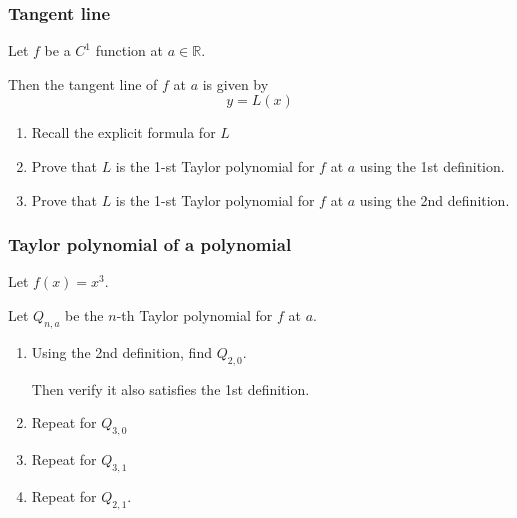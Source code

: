 \begin{frame}[t]
	\frametitle{Tangent line}

	Let $f$ be a $C^{1}$ function at $a \in \mathbb{R}$.

	Then the tangent line of $f$ at $a$ is given by
	\[
		y = L(x)
	\]
	\begin{enumerate}
		\item Recall the explicit formula for $L$

		\item Prove that $L$ is the 1-st Taylor polynomial for $f$ at $a$ using the 1st
			definition.

		\item Prove that $L$ is the 1-st Taylor polynomial for $f$ at $a$ using the 2nd
			definition.
	\end{enumerate}
\end{frame}

\begin{frame}[t]
	\frametitle{Taylor polynomial of a polynomial}

	Let $f(x) = x^{3}$.

	Let $Q_{n,a}$ be the $n$-th Taylor polynomial for $f$ at $a$.
	\vspace{.2cm}

	\begin{enumerate}
		\item Using the 2nd definition, find $Q_{2,0}$.

			Then verify it also satisfies the 1st definition.
			\vspace{.2cm}

		\item Repeat for $Q_{3,0}$
			\vspace{.2cm}

		\item Repeat for $Q_{3,1}$
			\vspace{.2cm}

		\item Repeat for $Q_{2,1}$.
	\end{enumerate}
\end{frame}

